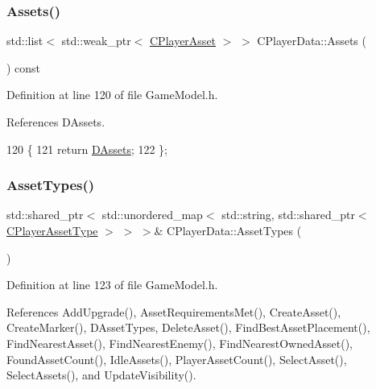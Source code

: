 \subsubsection{\texorpdfstring{Assets()}{Assets()}}
{\footnotesize\ttfamily std\+::list$<$ std\+::weak\+\_\+ptr$<$ \hyperlink{classCPlayerAsset}{C\+Player\+Asset} $>$ $>$ C\+Player\+Data\+::\+Assets (\begin{DoxyParamCaption}{ }\end{DoxyParamCaption}) const\hspace{0.3cm}{\ttfamily [inline]}}



Definition at line 120 of file Game\+Model.\+h.



References D\+Assets.


\begin{DoxyCode}
120                                                              \{
121             \textcolor{keywordflow}{return} \hyperlink{classCPlayerData_a1d7dd355facf52db6242e3554373906c}{DAssets};  
122         \};
\end{DoxyCode}
\hypertarget{classCPlayerData_adbe01c300ec2d40267ca84c7529b9045}{}\label{classCPlayerData_adbe01c300ec2d40267ca84c7529b9045} 
\subsubsection{\texorpdfstring{Asset\+Types()}{AssetTypes()}}
{\footnotesize\ttfamily std\+::shared\+\_\+ptr$<$ std\+::unordered\+\_\+map$<$ std\+::string, std\+::shared\+\_\+ptr$<$ \hyperlink{classCPlayerAssetType}{C\+Player\+Asset\+Type} $>$ $>$ $>$\& C\+Player\+Data\+::\+Asset\+Types (\begin{DoxyParamCaption}{ }\end{DoxyParamCaption})\hspace{0.3cm}{\ttfamily [inline]}}



Definition at line 123 of file Game\+Model.\+h.



References Add\+Upgrade(), Asset\+Requirements\+Met(), Create\+Asset(), Create\+Marker(), D\+Asset\+Types, Delete\+Asset(), Find\+Best\+Asset\+Placement(), Find\+Nearest\+Asset(), Find\+Nearest\+Enemy(), Find\+Nearest\+Owned\+Asset(), Found\+Asset\+Count(), Idle\+Assets(), Player\+Asset\+Count(), Select\+Asset(), Select\+Assets(), and Update\+Visibility().


